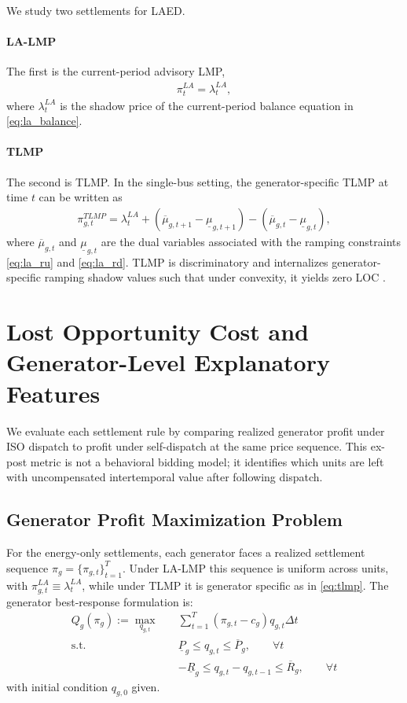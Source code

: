 \documentclass[conference]{IEEEtran}
\begin{document}
We study two settlements for LAED.

\paragraph{LA-LMP}
The first is the current-period advisory LMP,
\begin{align}
\pi_t^{LA} = \lambda_t^{LA}, \label{eq:la_lmp}
\end{align}
where $\lambda_t^{LA}$ is the shadow price of the current-period balance equation in \eqref{eq:la_balance}.

\paragraph{TLMP}
The second is TLMP. In the single-bus setting, the generator-specific TLMP at time $t$ can be written as
\begin{align}
\pi_{g,t}^{TLMP} = \lambda_t^{LA} + \left(\overline\mu_{g,t+1}-\underline\mu_{g,t+1}\right) - \left(\overline\mu_{g,t}-\underline\mu_{g,t}\right), \label{eq:tlmp}
\end{align}
where $\overline\mu_{g,t}$ and $\underline\mu_{g,t}$ are the dual variables associated with the ramping constraints \eqref{eq:la_ru} and \eqref{eq:la_rd}. TLMP is discriminatory and internalizes generator-specific ramping shadow values such that under convexity, it yields zero LOC \cite{Guo2021}.

\section{Lost Opportunity Cost and Generator-Level Explanatory Features}
\label{sec:loc}
We evaluate each settlement rule by comparing realized generator profit under ISO dispatch to profit under self-dispatch at the same price sequence. This ex-post metric is not a behavioral bidding model; it identifies which units are left with uncompensated intertemporal value after following dispatch.

\subsection{Generator Profit Maximization Problem}
For the energy-only settlements, each generator faces a realized settlement sequence $\pi_g = \{\pi_{g,t}\}_{t=1}^T$. Under LA-LMP this sequence is uniform across units, with $\pi_{g,t}^{LA}\equiv \lambda_t^{LA}$, while under TLMP it is generator specific as in \eqref{eq:tlmp}. The generator best-response formulation is: 
\begin{align}
Q_g(\pi_g) := \max_{q_{g,t}} \quad
& \sum_{t=1}^T \left( \pi_{g,t} - c_g \right) q_{g,t}\Delta t \label{eq:gen_br_obj}\\
\text{s.t.}\quad
& \underline P_g \le q_{g,t} \le \overline P_g, \qquad \forall t \label{eq:gen_cap}\\
& -\underline R_g \le q_{g,t} - q_{g,t-1} \le \overline R_g, \qquad \forall t \label{eq:gen_ramp}
\end{align}
with initial condition $q_{g,0}$ given.
\end{document}
